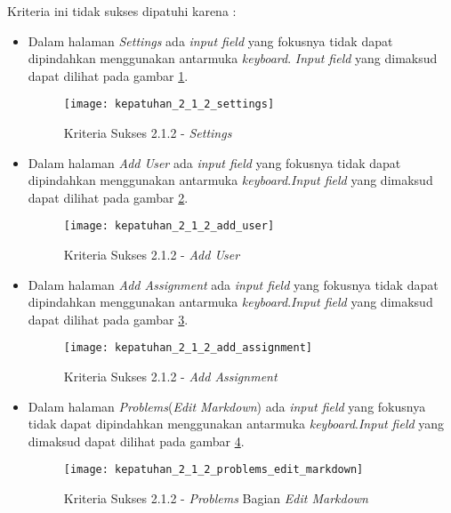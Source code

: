 Kriteria ini tidak sukses dipatuhi karena :
\begin{itemize}
	\item Dalam halaman \textit{Settings} ada \textit{input field} yang fokusnya tidak dapat dipindahkan menggunakan antarmuka \textit{keyboard}. \textit{Input field} yang dimaksud dapat dilihat pada gambar \ref{fig:kepatuhan_2_1_2_settings}.
	\begin{figure}[H]
		\centering  
		\texttt{[image: kepatuhan\_2\_1\_2\_settings]}  
		\caption[Kriteria Sukses 2.1.2 - \textit{Settings}]{Kriteria Sukses 2.1.2 - \textit{Settings}} 
		\label{fig:kepatuhan_2_1_2_settings} 
	\end{figure}

	\item Dalam halaman \textit{Add User} ada \textit{input field} yang fokusnya tidak dapat dipindahkan menggunakan antarmuka \textit{keyboard}.\textit{Input field} yang dimaksud dapat dilihat pada gambar \ref{fig:kepatuhan_2_1_2_add_user}.
	\begin{figure}[H]
		\centering  
		\texttt{[image: kepatuhan\_2\_1\_2\_add\_user]}  
		\caption[Kriteria Sukses 2.1.2 - \textit{Add User}]{Kriteria Sukses 2.1.2 - \textit{Add User}} 
		\label{fig:kepatuhan_2_1_2_add_user} 
	\end{figure}

	\item Dalam halaman \textit{Add Assignment} ada \textit{input field} yang fokusnya tidak dapat dipindahkan menggunakan antarmuka \textit{keyboard}.\textit{Input field} yang dimaksud dapat dilihat pada gambar \ref{fig:kepatuhan_2_1_2_add_assignment}.
	\begin{figure}[H]
		\centering  
		\texttt{[image: kepatuhan\_2\_1\_2\_add\_assignment]}  
		\caption[Kriteria Sukses 2.1.2 - \textit{Add Assignment}]{Kriteria Sukses 2.1.2 - \textit{Add Assignment}} 
		\label{fig:kepatuhan_2_1_2_add_assignment} 
	\end{figure}

	\item Dalam halaman \textit{Problems}(\textit{Edit Markdown}) ada \textit{input field} yang fokusnya tidak dapat dipindahkan menggunakan antarmuka \textit{keyboard}.\textit{Input field} yang dimaksud dapat dilihat pada gambar \ref{fig:kepatuhan_2_1_2_problems_edit_markdown}.
	\begin{figure}[H]
		\centering  
		\texttt{[image: kepatuhan\_2\_1\_2\_problems\_edit\_markdown]}  
		\caption[Kriteria Sukses 2.1.2 - \textit{Problems} Bagian \textit{Edit Markdown}]{Kriteria Sukses 2.1.2 - \textit{Problems} Bagian \textit{Edit Markdown}} 
		\label{fig:kepatuhan_2_1_2_problems_edit_markdown} 
	\end{figure}

\end{itemize}

